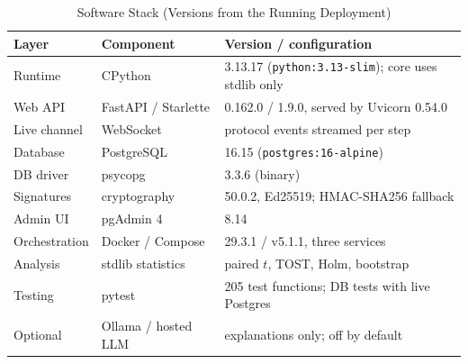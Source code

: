 \begin{table}[!t]
\centering
\caption{Software Stack (Versions from the Running Deployment)}
\label{tab:sw}
\scriptsize
\setlength{\tabcolsep}{2.5pt}
\begin{tabular}{@{}p{1.85cm}p{1.95cm}p{3.7cm}@{}}
\toprule
Layer & Component & Version / configuration \\
\midrule
Runtime & CPython & 3.13.17 (\texttt{python:3.13-slim}); core uses stdlib only \\
Web API & FastAPI / Starlette & 0.162.0 / 1.9.0, served by Uvicorn 0.54.0 \\
Live channel & WebSocket & protocol events streamed per step \\
Database & PostgreSQL & 16.15 (\texttt{postgres:16-alpine}) \\
DB driver & psycopg & 3.3.6 (binary) \\
Signatures & cryptography & 50.0.2, Ed25519; HMAC-SHA256 fallback \\
Admin UI & pgAdmin 4 & 8.14 \\
Orchestration & Docker / Compose & 29.3.1 / v5.1.1, three services \\
Analysis & stdlib statistics & paired $t$, TOST, Holm, bootstrap \\
Testing & pytest & 205 test functions; DB tests with live Postgres \\
Optional & Ollama / hosted LLM & explanations only; off by default \\
\bottomrule
\end{tabular}
\end{table}
